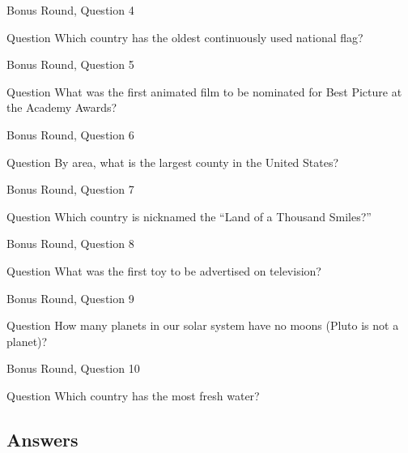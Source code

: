 \documentclass[11pt]{beamer}
\begin{document}
\begin{frame}{Bonus Round, Question 4}
\begin{block}{Question}
Which country has the oldest continuously used national flag\@?
\end{block}
\end{frame}
    

\begin{frame}{Bonus Round, Question 5}
\begin{block}{Question}
What was the first animated film to be nominated for Best Picture at the Academy Awards\@?
\end{block}
\end{frame}
    

\begin{frame}{Bonus Round, Question 6}
\begin{block}{Question}
By area, what is the largest county in the United States\@?
\end{block}
\end{frame}
    

\begin{frame}{Bonus Round, Question 7}
\begin{block}{Question}
Which country is nicknamed the ``Land of a Thousand Smiles?''
\end{block}
\end{frame}
    

\begin{frame}{Bonus Round, Question 8}
\begin{block}{Question}
What was the first toy to be advertised on television\@?
\end{block}
\end{frame}
    

\begin{frame}{Bonus Round, Question 9}
\begin{block}{Question}
How many planets in our solar system have no moons (Pluto is not a planet)\@?
\end{block}
\end{frame}
    

\begin{frame}{Bonus Round, Question 10}
\begin{block}{Question}
Which country has the most fresh water\@?
\end{block}
\end{frame}
    
\subsection{Answers}
\end{document}
